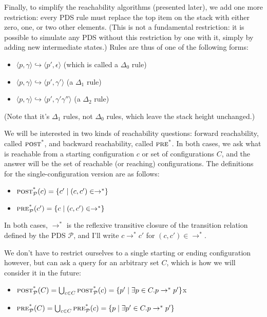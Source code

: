 \documentclass{article}
\newcommand{\Config}[2]{\ensuremath{\langle #1, #2 \rangle}}
\newcommand{\Rule}[2]{\ensuremath{#1 \hookrightarrow #2}}
\newcommand{\poststar}{\ensuremath{\textsc{post}^\textsc{*}}}
\newcommand{\prestar}{\ensuremath{\textsc{pre}^\textsc{*}}}
\begin{document}
Finally, to simplify the reachability algorithms (presented later), we
add one more restriction: every PDS rule must replace the top item on
the stack with either zero, one, or two other elements. (This is not a
fundamental restriction: it is possible to simulate any PDS without
this restriction by one with it, simply by adding new intermediate
states.) Rules are thus of one of the following forms:
\begin{itemize}
\item \Rule{\Config{p}{\gamma}}{\Config{p'}{\epsilon}} (which is called a
$\Delta_0$ rule)
\item \Rule{\Config{p}{\gamma}}{\Config{p'}{\gamma'}} (a $\Delta_1$
  rule)
\item \Rule{\Config{p}{\gamma}}{\Config{p'}{\gamma'\gamma''}} (a
  $\Delta_2$ rule)
\end{itemize}

(Note that it's $\Delta_1$ rules, not $\Delta_0$ rules, which leave
the stack height unchanged.)

We will be interested in two kinds of reachability questions: forward
reachability, called \poststar, and backward reachability, called
\prestar. In both cases, we ask what is reachable from a starting
configuration $c$ or set of configurations $C$, and the answer will be
the set of reachable (or reaching) configurations. The definitions for
the single-configuration version are as follows:
\begin{itemize}
\item $\poststar_{\mathcal{P}}(c) = \{c' \mid (c, c') \in \rightarrow^*\}$
\item $\prestar_{\mathcal{P}}(c') = \{c  \mid (c, c') \in \rightarrow^*\}$
\end{itemize}
In both cases, $\rightarrow^*$ is the reflexive transitive closure of
the transition relation defined by the PDS $\mathcal{P}$, and I'll
write $c \rightarrow^* c'$ for $(c, c') \in \rightarrow^*$.

We don't have to restrict ourselves to a single starting or ending
configuration however, but can ask a query for an arbitrary set $C$,
which is how we will consider it in the future:
\begin{itemize}
\item $\poststar_{\mathcal{P}}(C) = \bigcup_{c \in C} \poststar_{\mathcal{P}}(c)= \{p' \mid \exists p\in C. p \rightarrow^*
  p'\}$x
\item $\prestar_{\mathcal{P}}(C) = \bigcup_{c \in C} \prestar_{\mathcal{P}}(c)= \{p \mid \exists p'\in C. p \rightarrow^*
  p'\}$
\end{itemize}
\end{document}

